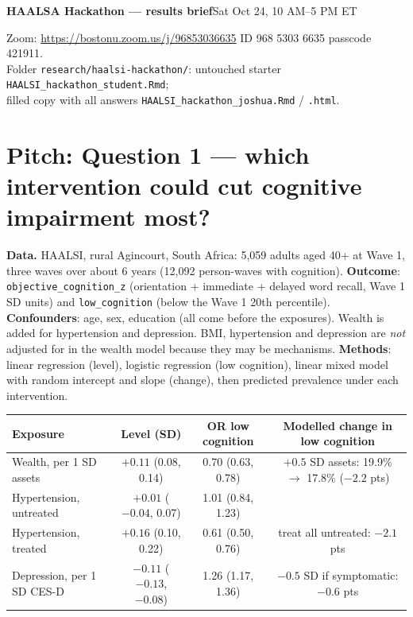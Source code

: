 \documentclass[10pt]{article}
\begin{document}
{\Large\bfseries HAALSA Hackathon --- results brief}\hfill Sat Oct 24, 10 AM--5 PM ET

Zoom: \url{https://bostonu.zoom.us/j/96853036635} \quad ID 968 5303 6635 \quad passcode 421911.\\
Folder \texttt{research/haalsi-hackathon/}: untouched starter \texttt{HAALSI\_hackathon\_student.Rmd};\\
filled copy with all answers \texttt{HAALSI\_hackathon\_joshua.Rmd} / \texttt{.html}.

\section*{Pitch: Question 1 --- which intervention could cut cognitive impairment most?}

\textbf{Data.} HAALSI, rural Agincourt, South Africa: 5{,}059 adults aged 40+ at Wave 1, three
waves over about 6 years (12{,}092 person-waves with cognition). \textbf{Outcome}:
\texttt{objective\_cognition\_z} (orientation + immediate + delayed word recall, Wave 1 SD units)
and \texttt{low\_cognition} (below the Wave 1 20th percentile). \textbf{Confounders}: age, sex,
education (all come before the exposures). Wealth is added for hypertension and depression. BMI,
hypertension and depression are \emph{not} adjusted for in the wealth model because they may be
mechanisms.
\textbf{Methods}: linear regression (level), logistic regression (low cognition), linear mixed
model with random intercept and slope (change), then predicted prevalence under each intervention.

\begin{center}\small
\begin{tabular}{@{}lccc@{}}
\toprule
Exposure & Level (SD) & OR low cognition & Modelled change in low cognition\\
\midrule
Wealth, per 1 SD assets & $+0.11$ (0.08, 0.14) & 0.70 (0.63, 0.78) & $+0.5$ SD assets: 19.9\% $\to$ 17.8\% ($-2.2$ pts)\\
Hypertension, untreated & $+0.01$ ($-0.04$, 0.07) & 1.01 (0.84, 1.23) & \\
Hypertension, treated & $+0.16$ (0.10, 0.22) & 0.61 (0.50, 0.76) & treat all untreated: $-2.1$ pts\\
Depression, per 1 SD CES-D & $-0.11$ ($-0.13$, $-0.08$) & 1.26 (1.17, 1.36) & $-0.5$ SD if symptomatic: $-0.6$ pts\\
\bottomrule
\end{tabular}
\end{center}
\end{document}
